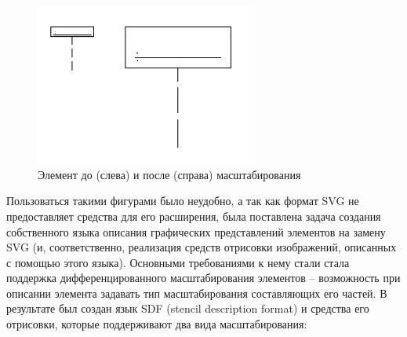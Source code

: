 \documentclass[a5paper]{article}
\begin{document}
\begin{figure} [ht]
  \begin{center}
    \includegraphics[width=7.35cm,height=5.295cm]{draft04-img3.jpg}
    \caption{Элемент до (слева) и после (справа) масштабирования}
    \label{scaling}
  \end{center}
\end{figure}

%

Пользоваться такими фигурами было неудобно, а так как формат
SVG не предоставляет средства для его
расширения, была поставлена задача создания собственного языка описания
графических представлений элементов на замену SVG (и, соответственно,
реализация средств отрисовки изображений, описанных с помощью этого
языка). Основными требованиями к нему стали стала поддержка
дифференцированного масштабирования элементов – возможность при
описании элемента задавать тип масштабирования составляющих его частей.
В результате был создан язык SDF (stencil description format) и
средства его отрисовки, которые поддерживают два вида масштабирования:
\end{document}
